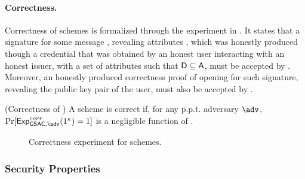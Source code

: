\paragraph{Correctness.} %
Correctness of \GSAC schemes is formalized through the experiment in
. It states that a signature for some message \msg,
revealing attributes \DAttrs, which was honestly produced though a credential
that was obtained by an honest user interacting with an honest issuer, with a
set of attributes \Attrs such that $\mathsf{D} \subseteq \mathsf{A}$, must be accepted
by \Verify. Moreover, an honestly produced correctness proof of opening for such
signature, revealing the public key pair of the user, must also be accepted by
\Judge.

\begin{definition}{(Correctness of \GSAC)}
  \label{def:correctness-gsac}
  A \GSAC scheme is correct if, for any p.p.t. adversary $\adv$,
  $\Pr[\ExpGSACCorrect(1^\secpar) = 1]$ is a negligible function of \secpar.
\end{definition}

\begin{figure}[htp!]
  \caption{Correctness experiment for \GSAC schemes.}
  \label{fig:exp-gsac-corr}
\end{figure}

\subsubsection{Security Properties}
\label{sssec:security-gsac}

